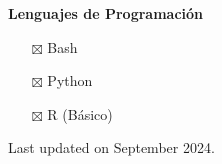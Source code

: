 \documentclass[11pt,a4paper,]{awesome-cv}
\providecommand{\tightlist}{%
	\setlength{\itemsep}{0pt}\setlength{\parskip}{0pt}}
\begin{document}
\textbf{Lenguajes de Programación}

\begin{itemize}
\tightlist
\item[$\boxtimes$]
  Bash
\item[$\boxtimes$]
  Python
\item[$\boxtimes$]
  R (Básico)
\end{itemize}

Last updated on September 2024.


\label{LastPage}~
\end{document}
